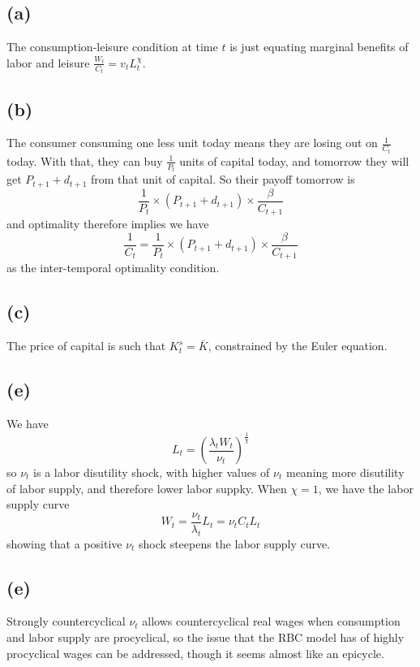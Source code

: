 \documentclass[11pt]{amsart}
\begin{document}
\subsection*{(a)}

The consumption-leisure condition at time $t$ is just equating marginal benefits of labor and leisure $\frac{W_t}{C_t} = v_t L_t^\chi$.

\subsection*{(b)}

The consumer consuming one less unit today means they are losing out on $\frac{1}{C_t}$ today. 
With that, they can buy $\frac{1}{P_t}$ units of capital today, and tomorrow they will get $P_{t+1} + d_{t+1}$ from that unit of capital. 
So their payoff tomorrow is 
\[
\frac{1}{P_t} \times (P_{t+1} + d_{t+1}) \times \frac{\beta}{C_{t+1}}
\]
and optimality therefore implies we have
\[
\frac{1}{C_t} = \frac{1}{P_t} \times (P_{t+1} + d_{t+1}) \times \frac{\beta}{C_{t+1}}
\]
as the inter-temporal optimality condition.

\subsection*{(c)}

The price of capital is such that $K_t^s = \bar{K}$, constrained by the Euler equation.

\subsection*{(e)} 
We have
	\begin{equation*}
	L_t = \left( \frac{\lambda_t W_t}{\nu_t} \right)^{\frac{1}{\chi}}
	\end{equation*}
	so $\nu_t$ is a labor disutility shock, with higher values of $\nu_t$ meaning more disutility of labor supply, and therefore lower labor suppky. 
	When $\chi = 1$, we have the labor supply curve 
	\begin{equation*}
	W_t = \frac{\nu_t}{\lambda_t} L_t = \nu_t C_t L_t  
	\end{equation*}
	showing that a positive $\nu_t$ shock steepens the labor supply curve. 
	
	\subsection*{(e)} Strongly countercyclical $\nu_t$ allows countercyclical real wages when consumption and labor supply are procyclical, so the issue that the RBC model has of highly procyclical wages can be addressed, though it seems almost like an epicycle.
\end{document}
